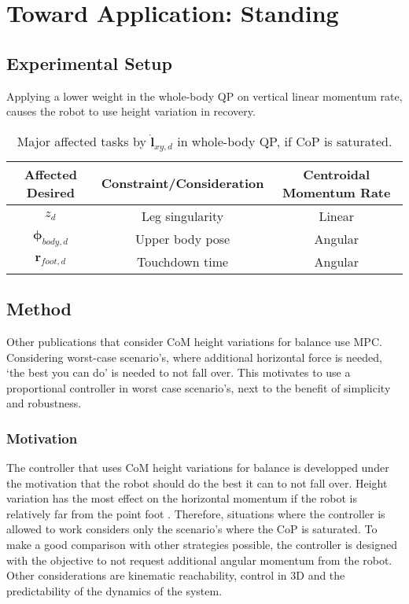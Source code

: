 \chapter{Toward Application: Standing}\label{chap:standing}

\section{Experimental Setup}
Applying a lower weight in the whole-body \ac{QP} on vertical linear momentum rate, causes the robot to use height variation in recovery.

\begin{table}[ht]
\caption{Major affected tasks by $\mathbf{\dot{l}}_{xy,d}$ in whole-body QP, if \ac{CoP} is saturated.} %
\centering %
\begin{tabular}{c c c } %
\hline\hline %
Affected Desired & Constraint/Consideration & Centroidal Momentum Rate \\
\hline %
 $z_d$ & Leg singularity & Linear\\
 $\boldsymbol{\phi}_{body,d}$ & Upper body pose & Angular\\
 $\mathbf{r}_{foot,d}$ &  Touchdown time & Angular\\
\hline %
\end{tabular}
\label{tab:eatqp} %
\end{table}

\section{Method}
Other publications that consider \ac{CoM} height variations for balance use \ac{MPC}. Considering worst-case scenario's, where additional horizontal force is needed, `the best you can do' is needed to not fall over. This motivates to use a proportional controller in worst case scenario's, next to the benefit of simplicity and robustness.

\subsection{Motivation}
The controller that uses \ac{CoM} height variations for balance is developped under the motivation that the robot should do the best it can to not fall over. Height variation has the most effect on the horizontal momentum if the robot is relatively far from the point foot . Therefore, situations where the controller is allowed to work considers only the scenario's where the \ac{CoP} is saturated.
\paraskip
To make a good comparison with other strategies possible, the controller is designed with the objective to not request additional angular momentum from the robot. Other considerations are kinematic reachability, control in \ac{3D} and the predictability of the dynamics of the system.

